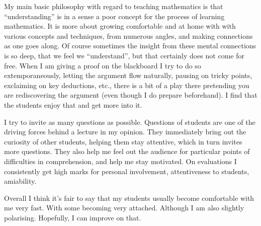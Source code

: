 \documentclass{amsart}
\begin{document}
My main basic philosophy with regard
to teaching mathematics is that ``understanding'' is in a sense
a poor concept for the process of learning mathematics. It is more about growing comfortable and at home with
with various concepts and techniques, from numerous angles,
and making connections as one goes along. 
Of course sometimes the insight
from these mental connections is so deep, that we feel we ``understand'', but that
certainly does not come for free. When I am giving a proof on the blackboard I try to do so extemporaneously, letting the argument flow naturally, pausing on tricky points, exclaiming on key deductions, etc., there is a bit of a play there pretending you are rediscovering the argument (even though I do prepare beforehand).
I find that the students enjoy that and get more into it. 

I try to invite as many questions as possible. Questions of
students are one of the driving forces behind a lecture in my opinion. They
immediately bring out the curiosity of other students, helping
them stay attentive, which in turn invites more questions. They also help me
feel out the audience for particular points of difficulties in comprehension, and
help me stay motivated. On evaluations I consistently get high marks for personal involvement, attentiveness to students, amiability.

%  
Overall I think it's fair to say that my students usually become comfortable
with me very fast. With some becoming very attached. Although I am also
slightly polarising. Hopefully, I can improve on that.
\end{document}
